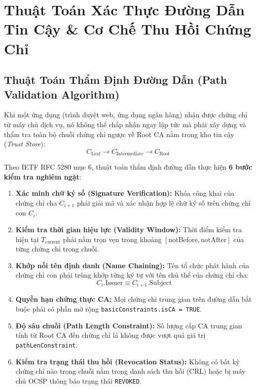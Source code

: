 \chapter{Thuật Toán Xác Thực Đường Dẫn Tin Cậy \& Cơ Chế Thu Hồi Chứng Chỉ}


\section{Thuật Toán Thẩm Định Đường Dẫn (Path Validation Algorithm)}

Khi một ứng dụng (trình duyệt web, ứng dụng ngân hàng) nhận được chứng chỉ từ máy chủ dịch vụ, nó không thể chấp nhận ngay lập tức mà phải xây dựng và thẩm tra toàn bộ chuỗi chứng chỉ ngược về Root CA nằm trong kho tin cậy (\emph{Trust Store}):
\begin{equation}
C_{\text{Leaf}} \to C_{\text{Intermediate}} \to C_{\text{Root}}
\end{equation}

Theo IETF RFC 5280 mục 6, thuật toán thẩm định đường dẫn thực hiện \textbf{6 bước kiểm tra nghiêm ngặt}:
\begin{enumerate}
  \item \textbf{Xác minh chữ ký số (Signature Verification):} Khóa công khai của chứng chỉ cha $C_{i+1}$ phải giải mã và xác nhận hợp lệ chữ ký số trên chứng chỉ con $C_i$.
  \item \textbf{Kiểm tra thời gian hiệu lực (Validity Window):} Thời điểm kiểm tra hiện tại $T_{\text{current}}$ phải nằm trọn vẹn trong khoảng $[\text{notBefore}, \text{notAfter}]$ của từng chứng chỉ trong chuỗi.
  \item \textbf{Khớp nối tên định danh (Name Chaining):} Tên tổ chức phát hành của chứng chỉ con phải trùng khớp từng ký tự với tên chủ thể của chứng chỉ cha:
  \begin{equation}
  C_i.\text{Issuer} \equiv C_{i+1}.\text{Subject}
  \end{equation}
  \item \textbf{Quyền hạn chứng thực CA:} Mọi chứng chỉ trung gian trên đường dẫn bắt buộc phải có phần mở rộng \texttt{basicConstraints.isCA = TRUE}.
  \item \textbf{Độ sâu chuỗi (Path Length Constraint):} Số lượng cấp CA trung gian tính từ Root CA đến chứng chỉ lá không được vượt quá giá trị \texttt{pathLenConstraint}.
  \item \textbf{Kiểm tra trạng thái thu hồi (Revocation Status):} Không có bất kỳ chứng chỉ nào trong chuỗi nằm trong danh sách thu hồi (CRL) hoặc bị máy chủ OCSP thông báo trạng thái \texttt{REVOKED}.
\end{enumerate}

